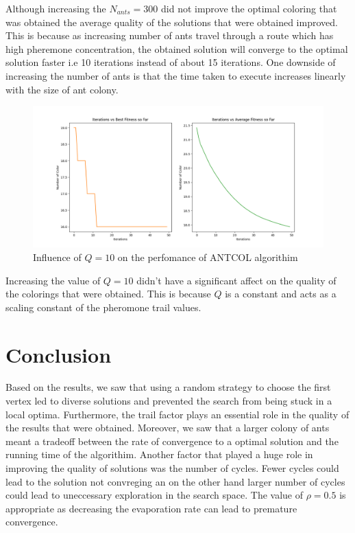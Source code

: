 \documentclass[a4paper]{article}
\begin{document}
Although increasing the $N_{ants} = 300$ did not improve the optimal coloring that was obtained the average quality of the solutions that were obtained improved. This is because as increasing number of ants travel through a route
which has high pheremone concentration, the obtained solution will converge to the optimal solution faster i.e 10 iterations instead of about 15 iterations. One downside of increasing the number of ants is that the time taken to execute
increases linearly with the size of ant colony.
\newpage
\begin{center}
    \begin{figure}[h]
    \centering
    \includegraphics[width=12cm]{Figures/fig12.png}
    \caption{Influence of $Q = 10$ on the perfomance of ANTCOL algorithim}
    \end{figure}
\end{center}
Increasing the value of $Q=10$ didn't have a significant affect on the quality of the colorings that were obtained. This is because $Q$ is a constant and acts as a scaling constant
of the pheromone trail values. 
\section*{Conclusion}

Based on the results, we saw that using a random strategy to choose the first vertex led to diverse solutions and prevented the search from being stuck in a local optima. Furthermore, the trail factor
plays an essential role in the quality of the results that were obtained. Moreover, we saw that a larger colony of ants meant a tradeoff between the rate of convergence to a optimal solution and the running time
of the algorithim. Another factor that played a huge role in improving the quality of solutions was the number of cycles. Fewer cycles could lead to the solution not convreging an on the other hand larger number of
cycles could lead to uneccessary exploration in the search space. The value of $\rho =0.5$ is appropriate as decreasing the evaporation rate can lead to premature convergence.
\end{document}
